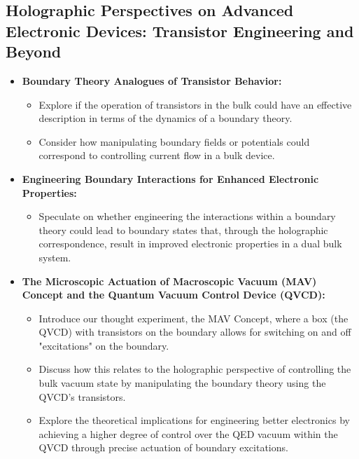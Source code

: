 \documentclass{amsart}
\begin{document}
\subsection{Holographic Perspectives on Advanced Electronic Devices: Transistor Engineering and Beyond}
\begin{itemize}
    \item \textbf{Boundary Theory Analogues of Transistor Behavior:}
        \begin{itemize}
            \item Explore if the operation of transistors in the bulk could have an effective description in terms of the dynamics of a boundary theory.
            \item Consider how manipulating boundary fields or potentials could correspond to controlling current flow in a bulk device.
        \end{itemize}
    \item \textbf{Engineering Boundary Interactions for Enhanced Electronic Properties:}
        \begin{itemize}
            \item Speculate on whether engineering the interactions within a boundary theory could lead to boundary states that, through the holographic correspondence, result in improved electronic properties in a dual bulk system.
        \end{itemize}
    \item \textbf{The Microscopic Actuation of Macroscopic Vacuum (MAV) Concept and the Quantum Vacuum Control Device (QVCD):}
        \begin{itemize}
            \item Introduce our thought experiment, the MAV Concept, where a box (the QVCD) with transistors on the boundary allows for switching on and off "excitations" on the boundary.
            \item Discuss how this relates to the holographic perspective of controlling the bulk vacuum state by manipulating the boundary theory using the QVCD's transistors.
            \item Explore the theoretical implications for engineering better electronics by achieving a higher degree of control over the QED vacuum within the QVCD through precise actuation of boundary excitations.
        \end{itemize}
\end{itemize}
\end{document}
